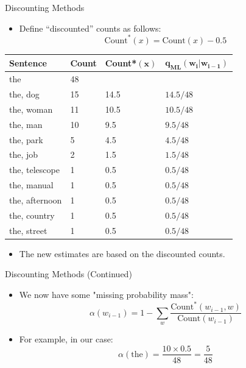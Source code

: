 \documentclass[10pt]{beamer}
\begin{document}
\begin{frame}{Discounting Methods}
\begin{scriptsize}
\begin{itemize}
\item Define ``discounted'' counts as follows:
\begin{displaymath}
\text{Count}^*(x) =\text{Count}(x)-0.5
\end{displaymath}

\end{itemize}

\begin{table}[h]
    \centering
    \begin{tabular}{llll}
        \textbf{Sentence} & \textbf{Count} & \textbf{Count}*$\mathbf{(x)}$ & $\mathbf{q_{\text{ML}}(w_i | w_{i-1})}$ \\
        \hline
        the & 48 & & \\
        the, dog & 15 & 14.5 & $14.5/48$ \\
        the, woman & 11 & 10.5 & $10.5/48$ \\
        the, man & 10 & 9.5 & $9.5/48$ \\
        the, park & 5 & 4.5 & $4.5/48$ \\
        the, job & 2 & 1.5 & $1.5/48$ \\
        the, telescope & 1 & 0.5 & $0.5/48$ \\
        the, manual & 1 & 0.5 & $0.5/48$ \\
        the, afternoon & 1 & 0.5 & $0.5/48$ \\
        the, country & 1 & 0.5 & $0.5/48$ \\
        the, street & 1 & 0.5 & $0.5/48$ \\
    \end{tabular}
\end{table}

\begin{itemize}
    \item The new estimates are based on the discounted counts.
\end{itemize}
\end{scriptsize}
\end{frame}



\begin{frame}{Discounting Methods (Continued)}
    \begin{itemize}
        \item We now have some "missing probability mass":
        \[
        \alpha(w_{i-1}) = 1 - \sum_{w} \frac{{\text{{Count}}^*(w_{i-1}, w)}}{{\text{{Count}}(w_{i-1})}}
        \]
        \item For example, in our case:
        \[
        \alpha(\text{{the}}) = \frac{{10 \times 0.5}}{{48}} = \frac{{5}}{{48}}
        \]
    \end{itemize}
\end{frame}
\end{document}
